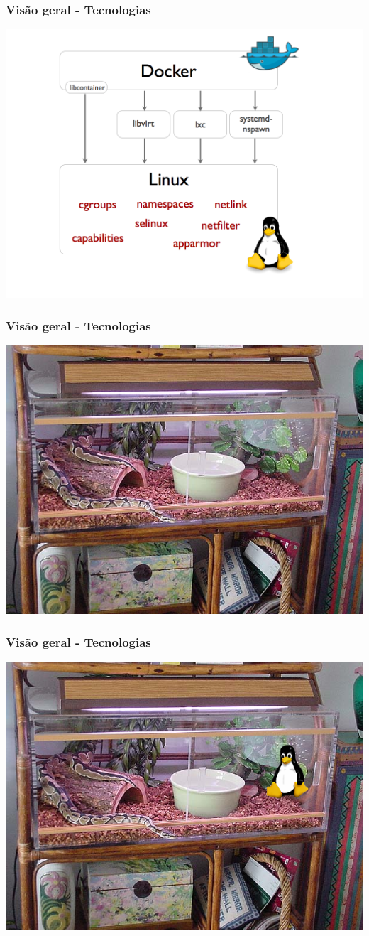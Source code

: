 \documentclass{beamer}
\begin{document}
\begin{frame}
    \frametitle{Visão geral - Tecnologias}
    \centering
    \includegraphics[width=1\linewidth]{img/docker-execdriver-diagram.png}
\end{frame}

\begin{frame}
    \frametitle{Visão geral - Tecnologias}
    \centering
    \includegraphics[width=0.8\linewidth]{img/BetsyAcyrilcSnakeCage02.JPG}
\end{frame}

\begin{frame}
    \frametitle{Visão geral - Tecnologias}
    \centering
    \includegraphics[width=0.8\linewidth]{img/BetsyAcyrilcSnakeCage02_tux.png}
\end{frame}
\end{document}
